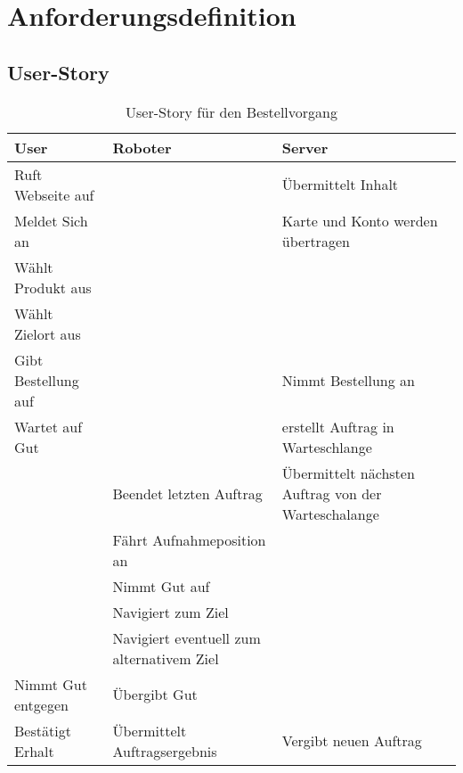 %
%
\chapter{Anforderungsdefinition} \label{Kap:3}




\section{User-Story}

\begin{table}[!ht]%
\begin{tabular}{p{40mm}|p{45mm}|p{55mm}} 
 User & Roboter & Server \\
\hline \hline
Ruft Webseite auf & & Übermittelt Inhalt\\
\hline
Meldet Sich an & & Karte und Konto werden übertragen\\
\hline
Wählt Produkt aus & &\\
\hline
Wählt Zielort aus & & \\
\hline
Gibt Bestellung auf & & Nimmt Bestellung an\\
\hline
Wartet auf Gut & & erstellt Auftrag in Warteschlange\\
\hline
& Beendet letzten Auftrag & Übermittelt nächsten Auftrag von der Warteschalange\\
\hline
& Fährt Aufnahmeposition an &\\
\hline
& Nimmt Gut auf &\\
\hline
& Navigiert zum Ziel &\\
\hline
& Navigiert eventuell zum alternativem Ziel &\\
\hline
Nimmt Gut entgegen & Übergibt Gut & \\
\hline
Bestätigt Erhalt & Übermittelt Auftragsergebnis & Vergibt neuen Auftrag\\
\end{tabular}
\caption{User-Story für den Bestellvorgang}
\label{fig:user-story}
\end{table}

